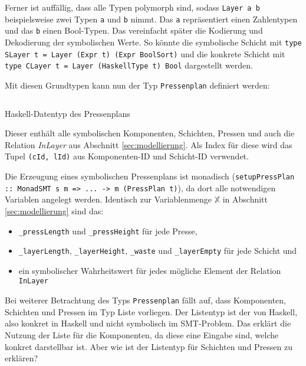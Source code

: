 Ferner ist auffällig, dass alle Typen polymorph sind, sodass \texttt{Layer a b} beispielsweise zwei Typen \texttt{a} und \texttt{b} nimmt.
Das \texttt{a} repräsentiert einen Zahlentypen und das \texttt{b} einen Bool-Typen.
Das vereinfacht später die Kodierung und Dekodierung der symbolischen Werte.
So könnte die symbolische Schicht mit \texttt{type SLayer t = Layer (Expr t) (Expr BoolSort)}
und die konkrete Schicht mit \texttt{type CLayer t = Layer (HaskellType t) Bool} dargestellt werden.

Mit diesen Grundtypen kann nun der Typ \texttt{Pressenplan} definiert werden:

\begin{listing}[H]
    \inputminted[linenos=true]{haskell}{Code/Implementierung/Datatypes2.hs}
    \caption{Haskell-Datentyp des Pressenplans}
    \label{listing:datatypes2}
\end{listing}

Dieser enthält alle symbolischen Komponenten, Schichten, Pressen und auch die Relation \textit{InLayer} aus Abschnitt \ref{sec:modellierung}.
Als Index für diese wird das Tupel \texttt{(cId, lId)} aus Komponenten-ID und Schicht-ID verwendet.

Die Erzeugung eines symbolischen Pressenplans ist monadisch (\texttt{setupPressPlan :: MonadSMT s m => ... -> m (PressPlan t)}), da dort alle notwendigen Variablen angelegt werden.
Identisch zur Variablenmenge $\mathbb{X}$ in Abschnitt \ref{sec:modellierung} sind das:

\begin{itemize}
    \item \texttt{\_pressLength} und \texttt{\_pressHeight} für jede Presse,
    \item \texttt{\_layerLength}, \texttt{\_layerHeight}, \texttt{\_waste} und \texttt{\_layerEmpty} für jede Schicht und
    \item ein symbolischer Wahrheitswert für jedes mögliche Element der Relation \texttt{InLayer}
\end{itemize}

Bei weiterer Betrachtung des Typs \texttt{Pressenplan} fällt auf, dass Komponenten, Schichten und Pressen im Typ Liste vorliegen.
Der Listentyp ist der von Haskell, also konkret in Haskell und nicht symbolisch im SMT-Problem.
Das erklärt die Nutzung der Liste für die Komponenten, da diese eine Eingabe sind, welche konkret darstellbar ist.
Aber wie ist der Listentyp für Schichten und Pressen zu erklären?

